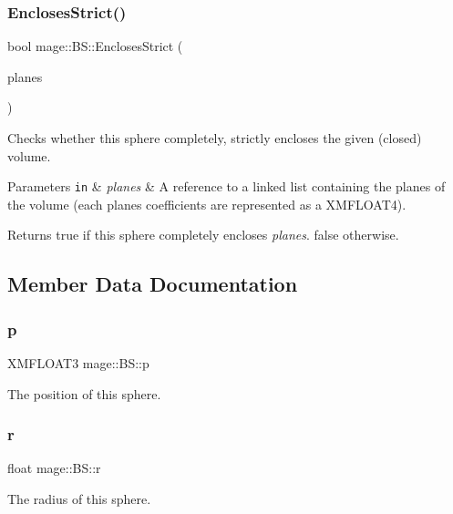 \subsubsection{\texorpdfstring{Encloses\+Strict()}{EnclosesStrict()}}
{\footnotesize\ttfamily bool mage\+::\+B\+S\+::\+Encloses\+Strict (\begin{DoxyParamCaption}\item[{const list$<$ X\+M\+F\+L\+O\+A\+T4 $>$ \&}]{planes }\end{DoxyParamCaption})}

Checks whether this sphere completely, strictly encloses the given (closed) volume.


\begin{DoxyParams}[1]{Parameters}
\mbox{\tt in}  & {\em planes} & A reference to a linked list containing the planes of the volume (each plane\textquotesingle{}s coefficients are represented as a {\ttfamily X\+M\+F\+L\+O\+A\+T4}). \\
\hline
\end{DoxyParams}
\begin{DoxyReturn}{Returns}
{\ttfamily true} if this sphere completely encloses {\itshape planes}. {\ttfamily false} otherwise. 
\end{DoxyReturn}


\subsection{Member Data Documentation}
\hypertarget{structmage_1_1_b_s_a30aa87318e657d71ae36e197136d59d2}{}\label{structmage_1_1_b_s_a30aa87318e657d71ae36e197136d59d2} 
\subsubsection{\texorpdfstring{p}{p}}
{\footnotesize\ttfamily X\+M\+F\+L\+O\+A\+T3 mage\+::\+B\+S\+::p}

The position of this sphere. \hypertarget{structmage_1_1_b_s_ab2e786e8493feb28a3bc0216e8dea5bc}{}\label{structmage_1_1_b_s_ab2e786e8493feb28a3bc0216e8dea5bc} 
\subsubsection{\texorpdfstring{r}{r}}
{\footnotesize\ttfamily float mage\+::\+B\+S\+::r}

The radius of this sphere. 